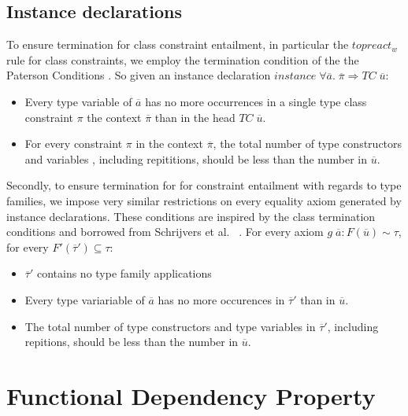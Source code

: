 \subsection{Instance declarations}
To ensure termination for class constraint entailment, in particular the
$topreact_w$ rule for class constraints, we employ the termination condition of
the the Paterson Conditions \cite[Def.~11]{fundeps-chrs}. So given an instance
declaration $instance \; \forall \overline{a}. \; \overline{\pi} \Rightarrow TC
\; \overline{u}$:

\begin{itemize}
    \item Every type variable of $\overline{a}$ has no more occurrences in a
    single type class constraint $\pi$ the context $\overline{\pi}$ than in the
    head $TC \; \overline{u}$.

    \item For every constraint $\pi$ in the context $\overline{\pi}$, the total
    number of type constructors and variables , including repititions, should be
    less than the number in $\overline{u}$.
\end{itemize}

Secondly, to ensure termination for for constraint entailment with regards to
type families, we impose very similar restrictions on every equality axiom
generated by instance declarations. These conditions are inspired by the class
termination conditions and borrowed from Schrijvers et
al.~\cite{type-checking-with-open-type-functions} .
For every axiom $g \; \overline{a} : F(\overline{u}) \sim \tau$, for every
$F'(\overline{\tau}') \subseteq \tau$:
\begin{itemize}
    \item $\overline{\tau}'$ contains no type family applications

    \item Every type variariable of $\overline{a}$ has no more occurences in
    $\overline{\tau}'$ than in $\overline{u}$.

    \item The total number of type constructors and type variables in
    $\overline{\tau}'$, including repitions, should be less than the number in
    $\overline{u}$.
\end{itemize}

\section{Functional Dependency Property}

